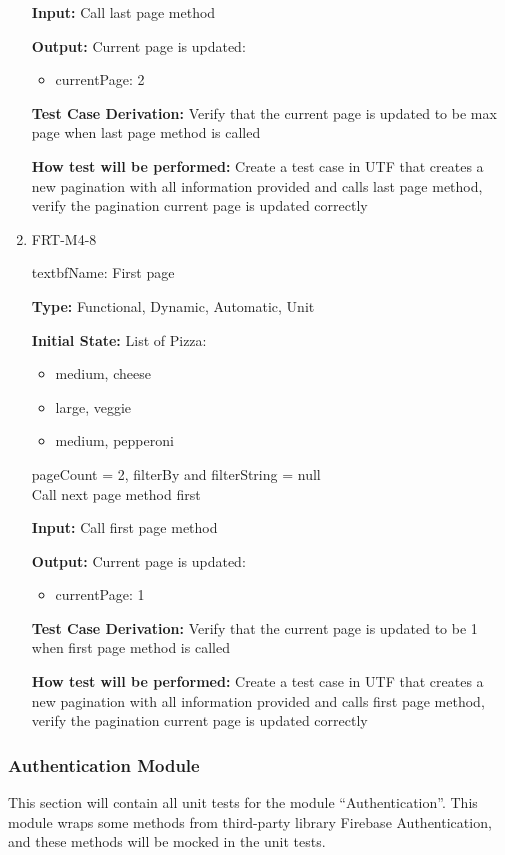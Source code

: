 \documentclass[12pt, titlepage]{article}
\begin{document}
\begin{enumerate}
\textbf{Input:} Call last page method
					
\textbf{Output:} Current page is updated:
\begin{itemize}
\item currentPage: 2
\end{itemize}

\textbf{Test Case Derivation:} Verify that the current page is updated to be max page when last page method is called

\textbf{How test will be performed:} Create a test case in UTF that creates a new pagination with all information provided and calls last page method, verify the pagination current page is updated correctly

\item{FRT-M4-8}

textbf{Name:} First page

\textbf{Type:} Functional, Dynamic, Automatic, Unit
					
\textbf{Initial State:} List of Pizza:
\begin{itemize}
\item medium, cheese
\item large, veggie
\item medium, pepperoni
\end{itemize}
pageCount = 2, filterBy and filterString = null\\
Call next page method first
					
\textbf{Input:} Call first page method
					
\textbf{Output:} Current page is updated:
\begin{itemize}
\item currentPage: 1
\end{itemize}

\textbf{Test Case Derivation:} Verify that the current page is updated to be 1 when first page method is called

\textbf{How test will be performed:} Create a test case in UTF that creates a new pagination with all information provided and calls first page method, verify the pagination current page is updated correctly
\end{enumerate}

\subsubsection{Authentication Module}

This section will contain all unit tests for the module ``Authentication''.  This module wraps some methods from third-party library Firebase Authentication, and these methods will be mocked in the unit tests.
\end{document}
